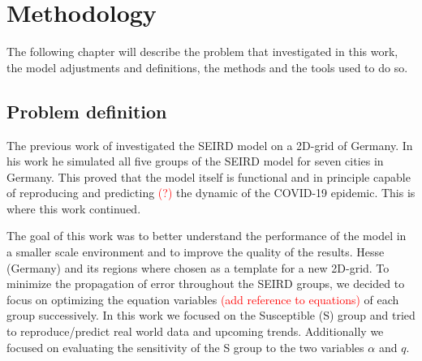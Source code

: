
\chapter{Methodology} %
The following chapter will describe the problem that investigated in this work, the model adjustments and definitions,
the methods and the tools used to do so.

\label{chap:methodology} %


\section{Problem definition}
\label{sec:problemDef}

The previous work of \cite{Rastogi} investigated the SEIRD model on a 2D-grid of Germany. In his work he simulated
all five groups of the SEIRD model for seven cities in Germany. This proved that the model itself is functional and
in principle capable of reproducing and predicting \textcolor{red}{(?)} the dynamic of the COVID-19 epidemic. This %
is where this work continued.\newline

\par
The goal of this work was to better understand the performance of the model in a smaller scale environment and to improve
the quality of the results. Hesse (Germany) and its regions where chosen as a template for a new 2D-grid. To minimize the
propagation of error throughout the SEIRD groups, we decided to focus on optimizing the equation variables
\textcolor{red}{(add reference to equations)} %
of each group successively. In this work we focused on the Susceptible (S) group and tried to reproduce/predict real world
data and upcoming trends. Additionally we focused on evaluating the sensitivity of the S group to the two variables
$\alpha$ and $q$.

